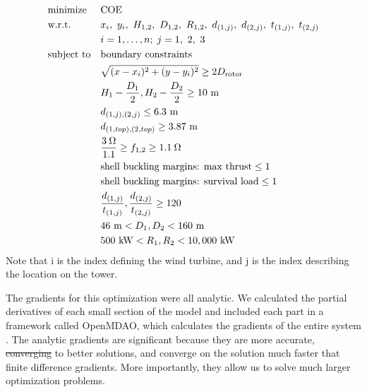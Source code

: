 \documentclass[wes, manuscript]{copernicus}
\providecommand{\DIFadd}[1]{{\protect\color{blue}\uwave{#1}}} %
\providecommand{\DIFdel}[1]{{\protect\color{red}\sout{#1}}}                      %
\providecommand{\DIFaddbegin}{} %
\providecommand{\DIFaddend}{} %
\providecommand{\DIFdelbegin}{} %
\providecommand{\DIFdelend}{} %
\begin{document}
        
        \begin{equation}
			\begin{aligned}
				& \text{minimize}
					& & \text{COE} \\
                & \text{w.r.t.} 
                	&& x_i,~ y_i,~ H_{1,2},~ D_{1,2},~ R_{1,2},~ d_{(1,j)},~ d_{(2,j)},~ t_{(1,j)},~t_{(2,j)}\\
                		&&& i = 1, \ldots, n; \; j = 1,~2,~3 \\
				& \text{subject to}
					& & \text{boundary constraints} \\
						&&& \sqrt{(x-x_i)^2+(y-y_i)^2} \geq 2D_{\text{rotor}} \\
						&&& H_1-\frac{D_1}{2}, H_2-\frac{D_2}{2} \geq 10~ \text{m}\\
                		&&& d_{(1,j),(2,j)} \leq 6.3~ \text{m}\\
                		&&& d_{(1,top),(2,top)} \geq 3.87~ \text{m}\\
						&&& \frac{3\hspace{0.08cm}\Omega}{1.1} \geq f_{1,2} \geq 1.1\hspace{0.08cm}\Omega \\
                		&&& \text{shell buckling margins: max thrust} \leq 1 \\
                        &&& \text{shell buckling margins: survival load} \leq 1 \\
                		&&& \frac{d_{(1,j)}}{t_{(1,j)}},\frac{d_{(2,j)}}{t_{(2,j)}} \geq 120\\
                        &&& 46~ \text{m} < D_1,D_2 < 160~ \text{m}  \\
                        &&& 500~ \text{kW} < R_1,R_2 < 10,000~ \text{kW} \\
			\end{aligned}
		\end{equation}
%
Note that i is the index defining the wind turbine, and j is the index describing the location on the tower.

        The gradients for this optimization were all analytic. We calculated the partial derivatives of each small section of the model and included each part in a framework called OpenMDAO, which calculates the gradients of the entire system \citep{gray2010openmdao}. The analytic gradients are significant because they are more accurate, \DIFdelbegin \DIFdel{converging }\DIFdelend \DIFaddbegin \DIFadd{converge }\DIFaddend to better solutions, and converge on the solution much faster that finite difference gradients. More importantly, they allow us to solve much larger optimization problems. %
\end{document}
